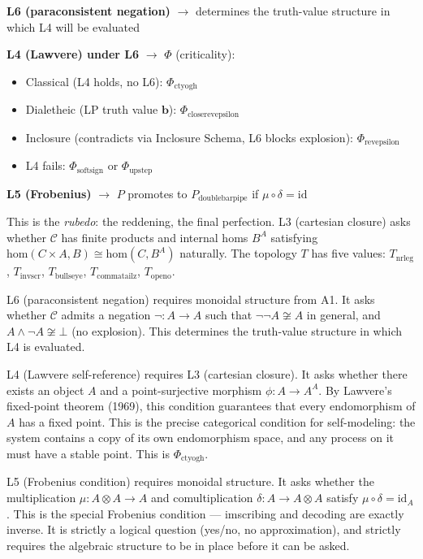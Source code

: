 \documentclass[12pt,a4paper]{article}
\begin{document}
\noindent\textbf{L6 (paraconsistent negation)} $\to$ determines the truth-value structure in which L4 will be evaluated

\noindent\textbf{L4 (Lawvere) under L6} $\to$ $\Phi$ (criticality):
\begin{itemize}
    \item Classical (L4 holds, no L6): $\Phi_{\text{ctyogh}}$
    \item Dialetheic (LP truth value $\mathbf{b}$): $\Phi_{\text{closerevepsilon}}$
    \item Inclosure (contradicts via Inclosure Schema, L6 blocks explosion): $\Phi_{\text{revepsilon}}$
    \item L4 fails: $\Phi_{\text{softsign}}$ or $\Phi_{\text{upstep}}$
\end{itemize}

\noindent\textbf{L5 (Frobenius)} $\to$ $P$ promotes to $P_{\text{doublebarpipe}}$ if $\mu \circ \delta = \text{id}$

This is the \emph{rubedo}: the reddening, the final perfection. L3 (cartesian closure) asks whether $\mathcal{C}$ has finite products and internal homs $B^A$ satisfying $\text{hom}(C \times A, B) \cong \text{hom}(C, B^A)$ naturally. The topology $T$ has five values: $T_{\text{nrleg}}$, $T_{\text{invscr}}$, $T_{\text{bullseye}}$, $T_{\text{commatailz}}$, $T_{\text{openo}}$. 

L6 (paraconsistent negation) requires monoidal structure from A1. It asks whether $\mathcal{C}$ admits a negation $\neg: A \to A$ such that $\neg\neg A \not\cong A$ in general, and $A \wedge \neg A \not\cong \bot$ (no explosion). This determines the truth-value structure in which L4 is evaluated.

L4 (Lawvere self-reference) requires L3 (cartesian closure). It asks whether there exists an object $A$ and a point-surjective morphism $\phi: A \to A^A$. By Lawvere's fixed-point theorem (1969), this condition guarantees that every endomorphism of $A$ has a fixed point. This is the precise categorical condition for self-modeling: the system contains a copy of its own endomorphism space, and any process on it must have a stable point. This is $\Phi_{\text{ctyogh}}$.

L5 (Frobenius condition) requires monoidal structure. It asks whether the multiplication $\mu: A \otimes A \to A$ and comultiplication $\delta: A \to A \otimes A$ satisfy $\mu \circ \delta = \text{id}_A$. This is the special Frobenius condition --- imscribing and decoding are exactly inverse. It is strictly a logical question (yes/no, no approximation), and strictly requires the algebraic structure to be in place before it can be asked.
\end{document}
